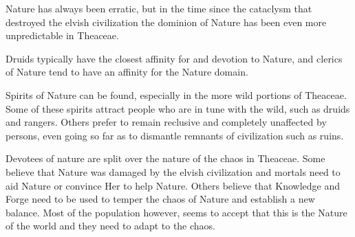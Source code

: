 Nature has always been erratic, but in the time since the cataclysm that destroyed the elvish civilization the dominion of Nature has been even more unpredictable in Theaceae.

Druids typically have the closest affinity for and devotion to Nature, and clerics of Nature tend to have an affinity for the Nature domain.

Spirits of Nature can be found, especially in the more wild portions of Theaceae.
Some of these spirits attract people who are in tune with the wild, such as druids and rangers.
Others prefer to remain reclusive and completely unaffected by persons, even going so far as to dismantle remnants of civilization such as ruins.

Devotees of nature are split over the nature of the chaos in Theaceae.
Some believe that Nature was damaged by the elvish civilization and mortals need to aid Nature or convince Her to help Nature.
Others believe that Knowledge and Forge need to be used to temper the chaos of Nature and establish a new balance.
Most of the population however, seems to accept that this is the Nature of the world and they need to adapt to the chaos.
